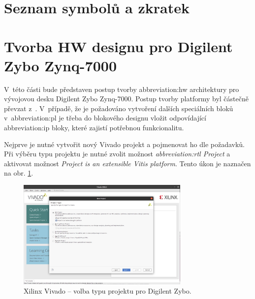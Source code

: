\documentclass[a4paper, twoside, 11pt]{article}
\newcommand{\fbar}{\FloatBarrier}
\begin{document}
	\begin{appendices}
	\section{Seznam symbolů a zkratek}

		\printglossary[type=abbreviationslist, style = myStyleAbbreviations]

		\fbar
		\newpage
		\printglossary[type=symbolslist, style =  myStyleSymbols]

		\section{Tvorba HW designu pro Digilent Zybo Zynq-7000}\label{sec:appendicies:-tvorba-hw-designu-pro-digilent-zybo-zynq-7000}
		V~této části bude představen postup tvorby \gls{abbreviation:hw} architektury pro vývojovou desku Digilent Zybo Zynq-7000. Postup tvorby platformy byl částečně převzat z~\cite{hackster-vitis-2021-1-embedded-platform-for-zybo-z7-20}. V~případě, že je požadováno vytvoření dalších speciálních bloků v~\gls{abbreviation:pl} je třeba do blokového designu vložit odpovídající \gls{abbreviation:ip} bloky, které zajistí potřebnou funkcionalitu.\par
		Nejprve je nutné vytvořit nový Vivado projekt a pojmenovat ho dle požadavků. Při výběru typu projektu je nutné zvolit možnost \textit{\gls{abbreviation:rtl} Project} a aktivovat možnost \textit{Project is an extensible Vitis platform}. Tento úkon je naznačen na obr. \ref{fig:zybo-xilinx-vivado-flow-01}.

			\begin{figure}[htbp!]
				\centering
				\includegraphics[width=0.75\textwidth]{src/png/zybo-xilinx-vivado-flow/zybo-xilinx-vivado-flow-01.jpg}
				\caption{Xilinx Vivado – volba typu projektu pro Digilent Zybo.}
				\label{fig:zybo-xilinx-vivado-flow-01}
			\end{figure}


\end{appendices}
\end{document}

